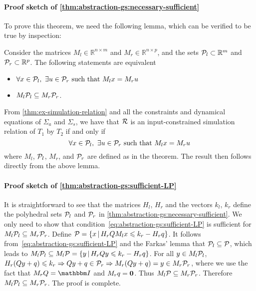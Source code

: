 \paragraph*{Proof sketch of \protect\cref{thm:abstraction-gs:necessary-sufficient}}

To prove this theorem, we need the following lemma, which can be verified to be true by inspection:
\begin{lemma}\label{lem:1}
Consider the matrices $M_{l} \in \mathbb{R}^{n\times m}$ and $M_{r} \in \mathbb{R}^{n\times p}$, and the sets $\mathcal{P}_{l} \subset \mathbb{R}^m$ and $\mathcal{P}_{r} \subset \mathbb{R}^p$. The following statements are equivalent
\begin{itemize}
	\item $\forall x \in \mathcal{P}_{l},\ \exists u \in \mathcal{P}_{r} \text{ such that } M_{l} x = M_{r} u$
	\item $M_{l} \mathcal{P}_{l} \subseteq M_{r} \mathcal{P}_{r}$.
\end{itemize}
\end{lemma}

From %
\cref{thm:ex-simulation-relation} %
and all the constraints and dynamical equations %
of $\Sigma_{a}$ and $\Sigma_{s}$, we have that $\mathcal{R}$ is an input-constrained simulation relation of $T_{1}$ by $T_{2}$ if and only if
\[\forall x \in \PSet_{l},\ \exists u \in \PSet_{r} \text{ such that } M_{l} x = M_{r} u\]
where $M_{l}$, $\mathcal{P}_{l}$, $M_{r}$, and $\mathcal{P}_{r}$ are defined as in the theorem.
The result then follows directly from the above lemma.


\paragraph*{Proof sketch of \protect\cref{thm:abstraction-gs:sufficient-LP}}

It is straightforward to see that the matrices $H_{l}$, $H_{r}$ and the vectors $k_{l}$, $k_{r}$ define the polyhedral sets $\mathcal{P}_{l}$ and $\mathcal{P}_{r}$ in \cref{thm:abstraction-gs:necessary-sufficient}.
We only need to show that condition~\eqref{eq:abstraction-gs:sufficient-LP} is sufficient for $M_{l} \mathcal{P}_{l} \subseteq M_{r} \mathcal{P}_{r}$.
Define $\mathcal{P} = \{ x \,|\, H_{r} Q M_{l} x \leqslant k_{r} - H_{r} q \}$.
It follows from~\eqref{eq:abstraction-gs:sufficient-LP} and the Farkas' lemma that
$\mathcal{P}_{l} \subseteq \mathcal{P}$, which leads to $M_{l} \mathcal{P}_{l} \subseteq M_{l} \mathcal{P} = \{ y \,|\, H_{r} Q y \leqslant k_{r} - H_{r} q \}$.
For all $y \in M_{l} \mathcal{P}_{l}$, $H_{r} (Q y + q) \leqslant k_{r} \Rightarrow Q y + q \in \mathcal{P}_{r} \Rightarrow M_{r} (Q y + q) = y \in M_{r} \mathcal{P}_{r}$, where we use the fact that $M_{r} Q = \IdentityMatrix$ and $M_{r} q = \mathbf{0}$.
Thus $M_{l} \mathcal{P} \subseteq M_{r} \mathcal{P}_{r}$.
Therefore $M_{l} \mathcal{P}_{l} \subseteq M_{r} \mathcal{P}_{r}$.
The proof is complete.


